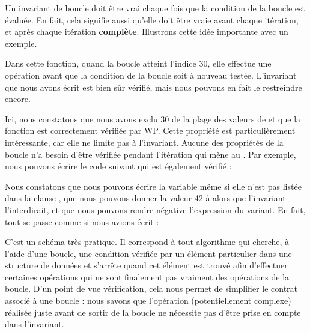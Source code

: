 Un invariant de boucle doit être vrai chaque fois que la condition de la boucle est
évaluée. En fait, cela signifie aussi qu'elle doit être vraie avant chaque itération,
et après chaque itération \textbf{complète}. Illustrons cette idée importante avec un
exemple.




Dans cette fonction, quand la boucle atteint l'indice 30, elle effectue une opération
 avant que la condition de la boucle soit à nouveau testée.
L'invariant que nous avons écrit est bien sûr vérifié, mais nous pouvons en fait le
restreindre encore.






Ici, nous constatons que nous avons exclu 30 de la plage des valeurs de
 et que la fonction est correctement vérifiée par WP. Cette propriété
est particulièrement intéressante, car elle ne limite pas à l'invariant.
Aucune des propriétés de la boucle n'a besoin d'être vérifiée pendant l'itération
qui mène au . Par exemple, nous pouvons écrire le code suivant
qui est également vérifié :





Nous constatons que nous pouvons écrire la variable  même si elle
n'est pas listée dans la clause , que nous pouvons
donner la valeur 42 à  alors que l'invariant l'interdirait, et
que nous pouvons rendre négative l'expression du variant. En fait, tout se passe
comme si nous avions écrit :





C'est un schéma très pratique. Il correspond à tout algorithme qui cherche, à l'aide
d'une boucle, une condition vérifiée par un élément particulier dans une structure
de données et s'arrête quand cet élément est trouvé afin d'effectuer certaines
opérations qui ne sont finalement pas vraiment des opérations de la boucle. D'un
point de vue vérification, cela nous permet de simplifier le contrat associé à
une boucle : nous savons que l'opération (potentiellement complexe) réalisée
juste avant de sortir de la boucle ne nécessite pas d'être prise en compte dans
l'invariant.



